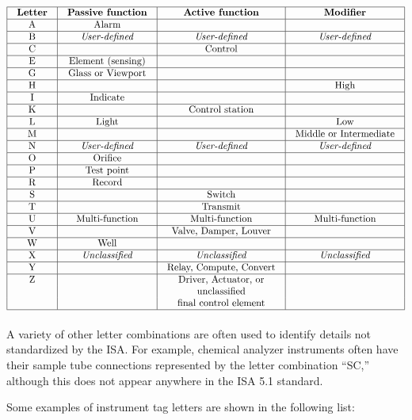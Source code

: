 $$\vbox{\offinterlineskip
\halign{\strut
\vrule \quad\hfil # \ \hfil & 
\vrule \quad\hfil # \ \hfil & 
\vrule \quad\hfil # \ \hfil & 
\vrule \quad\hfil # \ \hfil \vrule \cr
\noalign{\hrule}
%
\textbf{Letter} & \textbf{Passive function} & \textbf{Active function} & \textbf{Modifier} \cr
%
\noalign{\hrule}
%
A & Alarm &  &  \cr
%
\noalign{\hrule}
%
B & \textit{User-defined} & \textit{User-defined} & \textit{User-defined} \cr
%
\noalign{\hrule}
%
C &  & Control &  \cr
%
\noalign{\hrule}
%
E & Element (sensing) &  &  \cr
%
\noalign{\hrule}
%
G & Glass or Viewport &  &  \cr
%
\noalign{\hrule}
%
H &  &  & High \cr
%
\noalign{\hrule}
%
I & Indicate &  &  \cr
%
\noalign{\hrule}
%
K &  & Control station &  \cr
%
\noalign{\hrule}
%
L & Light &  & Low \cr
%
\noalign{\hrule}
%
M &  &  & Middle or Intermediate \cr
%
\noalign{\hrule}
%
N & \textit{User-defined} & \textit{User-defined} & \textit{User-defined} \cr
%
\noalign{\hrule}
%
O & Orifice &  &  \cr
%
\noalign{\hrule}
%
P & Test point &  &  \cr
%
\noalign{\hrule}
%
R & Record &  &  \cr
%
\noalign{\hrule}
%
S &  & Switch &  \cr
%
\noalign{\hrule}
%
T &  & Transmit &  \cr
%
\noalign{\hrule}
%
U & Multi-function & Multi-function & Multi-function \cr
%
\noalign{\hrule}
%
V &  & Valve, Damper, Louver &  \cr
%
\noalign{\hrule}
%
W & Well &  &  \cr
%
\noalign{\hrule}
%
X & \textit{Unclassified} & \textit{Unclassified} & \textit{Unclassified} \cr
%
\noalign{\hrule}
%
Y &  & Relay, Compute, Convert &  \cr
%
\noalign{\hrule}
%
Z &  & Driver, Actuator, or &  \cr
 &  & unclassified &  \cr
 &  & final control element &  \cr
%
\noalign{\hrule}
} %
}$$ %

A variety of other letter combinations are often used to identify details not standardized by the ISA.  For example, chemical analyzer instruments often have their sample tube connections represented by the letter combination ``SC,'' although this does not appear anywhere in the ISA 5.1 standard.

\filbreak

Some examples of instrument tag letters are shown in the following list:

